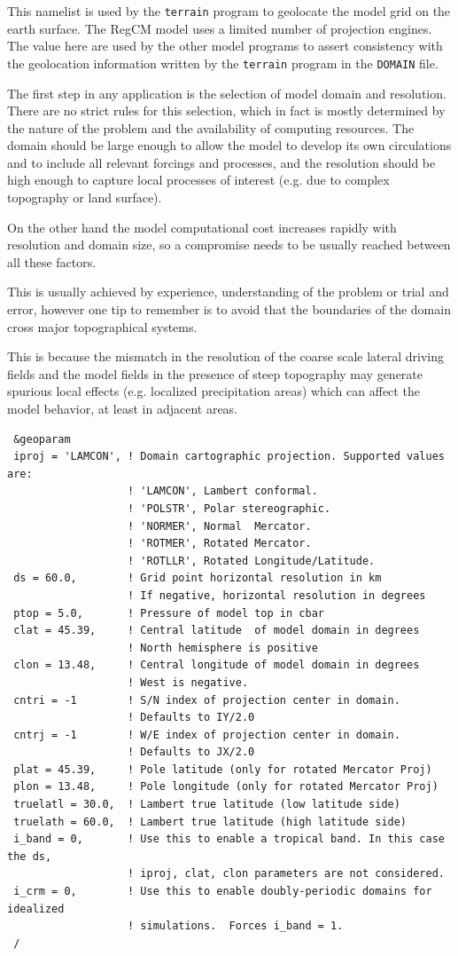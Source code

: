 This namelist is used by the \verb=terrain= program to geolocate the model grid
on the earth surface. The RegCM model uses a limited number of projection
engines. The value here are used by the other model programs to assert
consistency with the geolocation information written by the \verb=terrain=
program in the \verb=DOMAIN= file.

The first step in any application is the selection of model domain and
resolution. There are no strict rules for this selection, which in fact is
mostly determined by the nature of the problem and the availability of
computing resources. The domain should be large enough to allow the model to
develop its own circulations and to include all relevant forcings and
processes, and the resolution should be high enough to capture local processes
of interest (e.g. due to complex topography or land surface).

On the other hand the model computational cost increases rapidly with
resolution and domain size, so a compromise needs to be usually reached
between all these factors.

This is usually achieved by experience, understanding of the problem or
trial and error, however one tip to remember is to avoid that the boundaries
of the domain cross major topographical systems.

This is because the mismatch in the resolution of the coarse scale lateral
driving fields and the model fields in the presence of steep topography may
generate spurious local effects (e.g. localized precipitation areas) which can
affect the model behavior, at least in adjacent areas. 

{\footnotesize
\begin{Verbatim}
 &geoparam
 iproj = 'LAMCON', ! Domain cartographic projection. Supported values are:
                   ! 'LAMCON', Lambert conformal.
                   ! 'POLSTR', Polar stereographic.
                   ! 'NORMER', Normal  Mercator.
                   ! 'ROTMER', Rotated Mercator.
                   ! 'ROTLLR', Rotated Longitude/Latitude.
 ds = 60.0,        ! Grid point horizontal resolution in km
                   ! If negative, horizontal resolution in degrees
 ptop = 5.0,       ! Pressure of model top in cbar
 clat = 45.39,     ! Central latitude  of model domain in degrees
                   ! North hemisphere is positive
 clon = 13.48,     ! Central longitude of model domain in degrees
                   ! West is negative.
 cntri = -1        ! S/N index of projection center in domain.
                   ! Defaults to IY/2.0
 cntrj = -1        ! W/E index of projection center in domain.
                   ! Defaults to JX/2.0
 plat = 45.39,     ! Pole latitude (only for rotated Mercator Proj)
 plon = 13.48,     ! Pole longitude (only for rotated Mercator Proj)
 truelatl = 30.0,  ! Lambert true latitude (low latitude side)
 truelath = 60.0,  ! Lambert true latitude (high latitude side)
 i_band = 0,       ! Use this to enable a tropical band. In this case the ds,
                   ! iproj, clat, clon parameters are not considered.
 i_crm = 0,        ! Use this to enable doubly-periodic domains for idealized
                   ! simulations.  Forces i_band = 1.
 /
\end{Verbatim}
}

